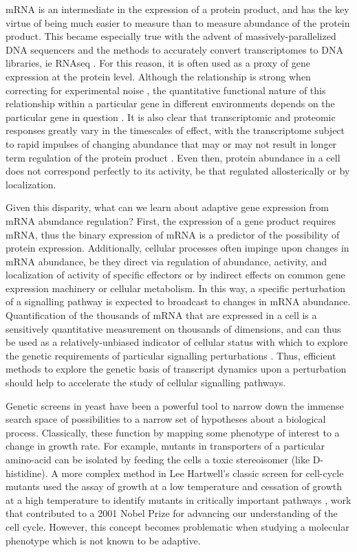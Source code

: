 {mRNA is an intermediate in the expression of a protein product, and
has the key virtue of being much easier to measure than to measure
abundance of the protein product. This became especially true with the
advent of massively-parallelized DNA sequencers and the methods to
accurately convert transcriptomes to DNA libraries, ie RNAseq
\parencite{shendure2017dna}. For this reason, it is often used as a proxy
of gene expression at the protein level. Although the relationship is
strong when correcting for experimental noise 
,
the quantitative functional nature of this relationship within a
particular gene in different environments depends on the particular
gene in question 
\parencite{franks2017post}. It is also clear that
transcriptomic and proteomic responses greatly vary in the timescales
of effect, with the transcriptome subject to rapid impulses of
changing abundance that may or may not result in longer term
regulation of the protein product 
\parencite{cheng2016differential,lee2011dynamic}. 
Even then, protein abundance in a cell does not correspond
perfectly to its activity, be that regulated allosterically or by
localization.  

Given this disparity, what can we learn about adaptive
gene expression from mRNA abundance regulation? First, the expression
of a gene product requires mRNA, thus the binary expression of mRNA is
a predictor of the possibility of protein expression. Additionally,
cellular processes often impinge upon changes in mRNA abundance, be
they direct via regulation of abundance, activity, and localization of
activity of specific effectors or by indirect effects on common gene
expression machinery or cellular metabolism. In this way, a specific
perturbation of a signalling pathway is expected to broadcast to
changes in mRNA abundance. Quantification of the thousands of mRNA
that are expressed in a cell is a sensitively quantitative measurement
on thousands of dimensions, and can thus be used as a
relatively-unbiased indicator of cellular status with which to explore
the genetic requirements of particular signalling perturbations 
. Thus, efficient methods to explore the genetic
basis of transcript dynamics upon a perturbation should help to
accelerate the study of cellular signalling pathways.  

Genetic screens
in yeast have been a powerful tool to narrow down the immense search
space of possibilities to a narrow set of hypotheses about a
biological process. Classically, these function by mapping some
phenotype of interest to a change in growth rate. For example, mutants
in transporters of a particular amino-acid can be isolated by feeding
the cells a toxic stereoisomer (like D-histidine). A more complex
method in Lee Hartwell’s classic screen for cell-cycle mutants used
the assay of growth at a low temperature and cessation of growth at a
high temperature to identify mutants in critically important pathways
\parencite{hartwell1970genetic}, work that contributed to a 2001 Nobel Prize for
advancing our understanding of the cell cycle. However, this concept
becomes problematic when studying a molecular phenotype which is not
known to be adaptive. 

}
